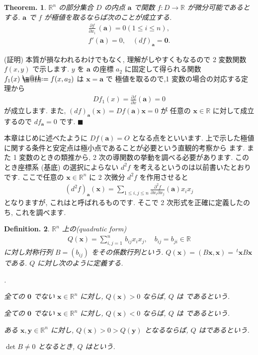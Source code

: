 \documentclass[openany, a4paper, oneside]{jsbook}
\makeatletter
\newcounter{enum2}
\renewenvironment{enumerate}{%
\begin{list}%
{%
\arabic{enum2}.\ \,%
}%
{%
\usecounter{enum2}
\setlength{\itemindent}{0pt}%
\setlength{\leftmargin}{15pt}%
\setlength{\rightmargin}{0pt}%
\setlength{\labelsep}{0pt}%
\setlength{\labelwidth}{6pt}%
\setlength{\itemsep}{0pt}%
\setlength{\parsep}{0pt}%
\setlength{\listparindent}{0pt}%
}
}{%
\end{list}%
}
\newcommand*{\defeq}{\mathrel{\rlap{%
\raisebox{0.3ex}{$\m@th\cdot$}}%
\raisebox{-0.3ex}{$\m@th\cdot$}}%
=}
\theoremstyle{break}
\newtheorem{thm}{Theorem.}[section]
\theoremstyle{breakdefn}
\newtheorem{defn}[thm]{Definition.}
\newcommand{\bbR}{\mathbb{R}}
\makeatother
\begin{document}
\begin{thm}
$\bbR^n$ の部分集合 $D$ の内点 $\bm{a}$ で関数 $f:D\to\bbR$ が微分可能であるとする.
$\bm{a}$ で $f$ が極値を取るならば次のことが成立する.
\begin{align}
\frac{\partial f} {\partial x_i} \, (\bm{a})
=
0
(1 \leq i \leq n),\\
f'(\bm{a}) = 0,
\quad
(df) _{\bm{a}}=\bm{0}.
\end{align}
\end{thm}
(証明)
本質が損なわれるわけでもなく, 理解がしやすくもなるので 2 変数関数 $f (x,y)$ で示します.
$y$ を $\bm{a}$ の座標 $a_2$ に固定して得られる関数 $f_1 (x) \defeq f (x,a_2)$ は $\bm{x}=\bm{a}$ で
極値を取るので,1 変数の場合の対応する定理から
\begin{align}
D f_1 (x)
=
\frac{\partial f} {\partial x} ( \bm{a} )
=
0
\end{align}
が成立します. また,  $(df)_{ \bm{a} } ( \bm{x} ) = Df (\bm{a}) \bm{x} = 0$ が
任意の $\bm{x} \in \bbR$ に対して成立するので $df_{ \bm{a} } = 0$ です.  $\blacksquare$

本章はじめに述べたように $Df (\bm{a})=O$ となる点をといいます.
上で示した極値に関する条件と安定点は極小点であることが必要という直観的考察から
ます.
また 1 変数のときの類推から, 2 次の導関数の挙動を調べる必要があります.
このとき座標系 (基底) の選択によらない $d^2 f$ を考えるというのは以前書いたとおりです.
ここで任意の $\bm{x} \in \bbR^n$ に 2 次微分 $d^2f$ を作用させると
\begin{align}
(d^2 f)_{ \bm{a} } ( \bm{x} )
=
\sum_{1 \leq i ,j \leq n} \frac{ \partial^2 f} {\partial x_i \partial x_j} ( \bm{a} ) x_i  x_j
\end{align}
となりますが, これはと呼ばれるものです.
そこで 2 次形式を正確に定義したのち, これを調べます.

\begin{defn}
$\bbR^n$ 上の(quadratic form)
\begin{align}
Q ( \bm{x} )
=
\sum_{ i,j=1}^n \, b_{ij} x_i x_j , \quad b_{ij} = b_{j i} \in \bbR
\label{eq:8.11}
\end{align}
に対し対称行列 $B = ( b_{ ij } )$ をその係数行列という.
$Q ( \bm{x} ) = ( B\bm{x} , \bm{x} ) = \, ^t \bm{x} B \bm{x}$ である.
$Q$ に対し次のように定義する.
\begin{enumerate}
\item[1)] 全ての $\bm{0}$ でない $\bm{x} \in \bbR^n$ に対し,  $Q (\bm{x})>0$ ならば,  $Q$ は
であるという.
\item[2)] 全ての $\bm{0}$ でない $\bm{x} \in \bbR^n$ に対し,  $Q (\bm{x})<0$ ならば,  $Q$ は
であるという.
\item[3)] ある $\bm{x},\bm{y} \in \bbR^n$ に対し,  $Q (\bm{x}) > 0 > Q (\bm{y})$ となるならば,
$Q$ はであるという.
\item[4)] $\det B \not = 0$ となるとき,  $Q$ はという.
\end{enumerate}
\end{defn}
\end{document}
